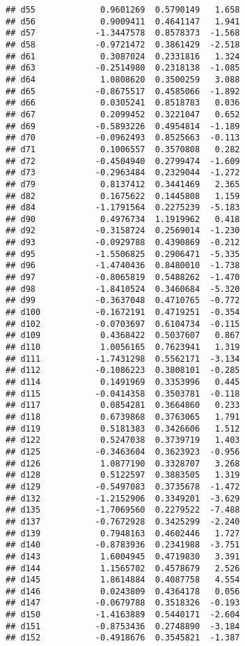 \documentclass[
]{article}
\begin{document}
\begin{verbatim}
## d55             0.9601269  0.5790149   1.658
## d56             0.9009411  0.4641147   1.941
## d57            -1.3447578  0.8578373  -1.568
## d58            -0.9721472  0.3861429  -2.518
## d61             0.3087024  0.2331816   1.324
## d63            -0.2514980  0.2318138  -1.085
## d64             1.0808620  0.3500259   3.088
## d65            -0.8675517  0.4585066  -1.892
## d66             0.0305241  0.8518783   0.036
## d67             0.2099452  0.3221047   0.652
## d69            -0.5893226  0.4954814  -1.189
## d70            -0.0962493  0.8525663  -0.113
## d71             0.1006557  0.3570808   0.282
## d72            -0.4504940  0.2799474  -1.609
## d73            -0.2963484  0.2329044  -1.272
## d79             0.8137412  0.3441469   2.365
## d82             0.1675622  0.1445808   1.159
## d84            -1.1791564  0.2275239  -5.183
## d90             0.4976734  1.1919962   0.418
## d92            -0.3158724  0.2569014  -1.230
## d93            -0.0929788  0.4390869  -0.212
## d95            -1.5506825  0.2906471  -5.335
## d96            -1.4740436  0.8480010  -1.738
## d97            -0.8065819  0.5488262  -1.470
## d98            -1.8410524  0.3460684  -5.320
## d99            -0.3637048  0.4710765  -0.772
## d100           -0.1672191  0.4719251  -0.354
## d102           -0.0703697  0.6104734  -0.115
## d109            0.4368422  0.5037607   0.867
## d110            1.0056165  0.7623941   1.319
## d111           -1.7431298  0.5562171  -3.134
## d112           -0.1086223  0.3808101  -0.285
## d114            0.1491969  0.3353996   0.445
## d115           -0.0414358  0.3503781  -0.118
## d117            0.0854281  0.3664860   0.233
## d118            0.6739868  0.3763065   1.791
## d119            0.5181383  0.3426606   1.512
## d122            0.5247038  0.3739719   1.403
## d125           -0.3463604  0.3623923  -0.956
## d126            1.0877190  0.3328707   3.268
## d128            0.5122597  0.3883505   1.319
## d129           -0.5497083  0.3735678  -1.472
## d132           -1.2152906  0.3349201  -3.629
## d135           -1.7069560  0.2279522  -7.488
## d137           -0.7672928  0.3425299  -2.240
## d139            0.7948163  0.4602446   1.727
## d140           -0.8783936  0.2341988  -3.751
## d143            1.6004945  0.4719830   3.391
## d144            1.1565702  0.4578679   2.526
## d145            1.8614884  0.4087758   4.554
## d146            0.0243809  0.4364178   0.056
## d147           -0.0679788  0.3518326  -0.193
## d150           -1.4163889  0.5440171  -2.604
## d151           -0.8753436  0.2748890  -3.184
## d152           -0.4918676  0.3545821  -1.387

\end{verbatim}
\end{document}
